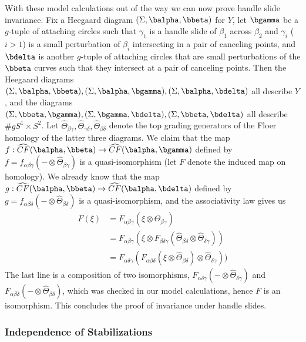 With these model calculations out of the way we can now prove handle slide invariance. Fix a Heegaard diagram $(\Sigma,\balpha,\bbeta)$ for $Y$, let $\bgamma$ be a $g$-tuple of attaching circles such that $\gamma_1$ is a handle slide of $\beta_1$ across $\beta_2$ and $\gamma_i$ ($i>1$) is a small perturbation of $\beta_i$ intersecting in a pair of canceling points, and $\bdelta$ is another $g$-tuple of attaching circles that are small perturbations of the $\bbeta$ curves such that they intersect at a pair of canceling points. Then the Heegaard diagrams $(\Sigma,\balpha,\bbeta),(\Sigma,\balpha,\bgamma),(\Sigma,\balpha,\bdelta)$ all describe $Y$, and the diagrams $(\Sigma,\bbeta,\bgamma),(\Sigma,\bgamma,\bdelta),(\Sigma,\bbeta,\bdelta)$ all describe $\# g S^1 \times S^2$. Let $\widehat{\Theta}_{\beta\gamma},\widehat{\Theta}_{\gamma\delta},\widehat{\Theta}_{\beta\delta}$ denote the top grading generators of the Floer homology of the latter three diagrams. We claim that the map $f : \widehat{CF}(\balpha,\bbeta) \rightarrow \widehat{CF}(\balpha,\bgamma)$ defined by $f = f_{\alpha\beta\gamma}(- \otimes \widehat{\Theta}_{\beta\gamma})$ is a quasi-isomorphism (let $F$ denote the induced map on homology). We already know that the map $g : \widehat{CF}(\balpha,\bbeta) \rightarrow \widehat{CF}(\balpha,\bdelta)$ defined by $g=f_{\alpha\beta\delta}(-\otimes\widehat{\Theta}_{\beta\delta})$ is a quasi-isomorphism, and the associativity law gives us
\begin{align*}
F(\xi) &= F_{\alpha\beta\gamma}(\xi \otimes \widehat{\Theta}_{\beta\gamma}) \\
       &= F_{\alpha\beta\gamma}(\xi \otimes F_{\beta\delta\gamma}(\widehat{\Theta}_{\beta\delta} \otimes \widehat{\Theta}_{\delta\gamma})) \\
       &= F_{\alpha\delta\gamma}(F_{\alpha\beta\delta}(\xi \otimes \widehat{\Theta}_{\beta\delta}) \otimes \widehat{\Theta}_{\delta\gamma}))
\end{align*}
The last line is a composition of two isomorphisms, $F_{\alpha\delta\gamma}(-\otimes\widehat{\Theta}_{\delta\gamma})$ and $F_{\alpha\beta\delta}(-\otimes\widehat{\Theta}_{\beta\delta})$, which was checked in our model calculations, hence $F$ is an isomorphism. This concludes the proof of invariance under handle slides.









\subsubsection{Independence of Stabilizations}


